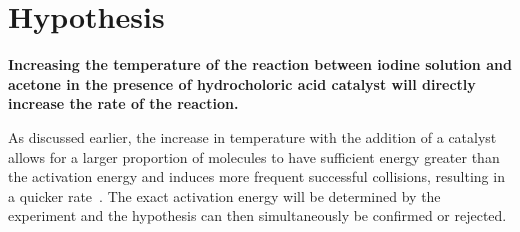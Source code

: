 \section{Hypothesis}

\textbf{Increasing the temperature of the reaction between iodine solution and acetone in the presence of hydrocholoric acid catalyst will directly increase the rate of the reaction.}

As discussed earlier, the increase in temperature with the addition of a catalyst allows for a larger proportion of molecules to have sufficient energy greater than the activation energy and induces more frequent successful collisions, resulting in a quicker rate~\parencite{general_catalysts}. The exact activation energy will be determined by the experiment and the hypothesis can then simultaneously be confirmed or rejected.

